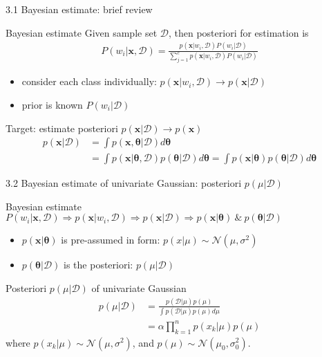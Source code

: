 \documentclass[compress,blue]{beamer}
\newcommand{\bx}{\mathbf{x}}
\newcommand{\calD}{\mathcal{D}}
\begin{document}
\begin{frame}{3.1 Bayesian estimate: brief review}
	\begin{block}{Bayesian estimate}
		Given sample set $\calD$, then posteriori for estimation is
		\begin{align}
			P(w_i | \bx, \calD) = \frac{p(\bx|w_i, \calD)P(w_i | \calD)}{\sum_{j=1}^c p(\bx | w_i, \calD)P(w_i | \calD)}
		\end{align}
		\vspace{-0.15in}
		\small
		\begin{itemize}
			\item consider each class individually: $p(\bx | w_i, \calD) \rightarrow p(\bx | \calD)$
			\item prior is known $P(w_i | \calD)$ 
		\end{itemize}
		Target: estimate posteriori $p(\bx | \calD) \rightarrow p(\bx)$
		\begin{align}
			p(\bx|\calD) &= \int p(\bx, \mathbf{\theta}|\calD) d\mathbf{\theta} \\
			 &= \int p(\bx | \mathbf{\theta}, \calD) p(\mathbf{\theta} | \calD) d\mathbf{\theta} 
			 = \int p(\bx | \mathbf{\theta}) p(\mathbf{\theta} | \calD) d\mathbf{\theta}
		\end{align}	
		\normalsize
	\end{block}	
\end{frame}

\begin{frame}{3.2 Bayesian estimate of univariate Gaussian: posteriori $p(\mu|\calD)$}
	\begin{block}{Bayesian estimate}
		$P(w_i | \bx, \calD) \Rightarrow p(\bx | w_i, \calD) \Rightarrow p(\bx | \calD) \Rightarrow p(\bx | \mathbf{\theta}) ~\&~ p(\mathbf{\theta} | \calD) $
		\begin{itemize}
			\item  $p(\bx | \mathbf{\theta})$ is pre-assumed in form: $p(x|\mu) \sim \mathcal{N}(\mu, \sigma^2)$
			\item $p(\mathbf{\theta} | \calD)$ is the posteriori: $p(\mu|\calD)$
		\end{itemize}
	\end{block}

	\begin{block}{Posteriori $p(\mu|\calD)$ of univariate Gaussian}
		\vspace{-0.15in}
		\begin{align}
			p(\mu|\calD) &= \frac{p(\calD | \mu) p(\mu)}{\int p(\calD | \mu) p(\mu) d\mu} \\
			& = \alpha \prod_{k=1}^n p(x_k | \mu)p(\mu)
		\end{align}
		where $p(x_k | \mu) \sim \mathcal{N}(\mu, \sigma^2)$, and $p(\mu) \sim \mathcal{N}(\mu_0, \sigma_0^2)$.
	\end{block}
\end{frame}
\end{document}
